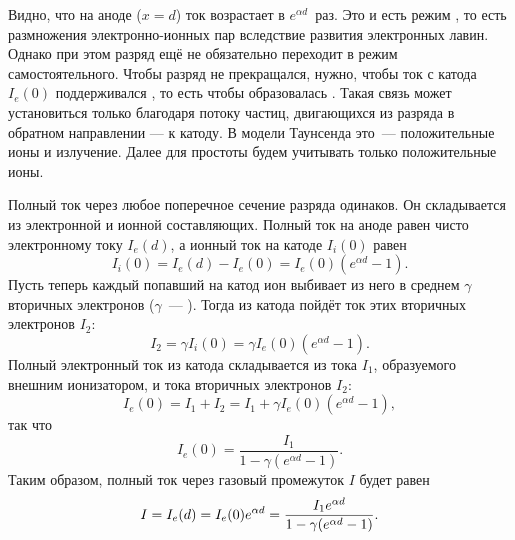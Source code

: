 Видно, что на аноде ($x=d$) ток возрастает в $e^{\alpha d}$~раз.
Это и есть режим , то есть размножения
электронно-ионных пар вследствие развития
электронных лавин. Однако при этом разряд ещё не обязательно переходит в режим
самостоятельного. Чтобы разряд не прекращался, нужно,
чтобы ток с катода $I_e(0)$ поддерживался ,
то есть чтобы образовалась .
Такая связь может установиться только благодаря потоку частиц, двигающихся
из разряда в обратном направлении --- к катоду. В модели Таунсенда это~---
положительные ионы и излучение. Далее для простоты будем учитывать только положительные ионы.

Полный ток через любое поперечное сечение разряда одинаков.
Он складывается из электронной и ионной составляющих.
Полный ток на аноде равен чисто электронному току $I_e(d)$,
а ионный ток на катоде $I_i(0)$ равен
\begin{equation*}
	I_i(0)=I_e(d)-I_e(0)=I_e(0)(e^{\alpha d}-1).
\end{equation*}
Пусть теперь каждый попавший на катод ион выбивает из него в среднем
$\gamma$ вторичных электронов
($\gamma$~--- ).
Тогда из катода пойдёт ток этих вторичных электронов $I_2$:
\begin{equation*}
	I_2=\gamma I_i(0)=\gamma I_e(0)(e^{\alpha d}-1).
\end{equation*}
Полный электронный ток из катода складывается из тока $I_1$,
образуемого внешним ионизатором, и тока вторичных электронов $I_2$:
\begin{equation*}
	I_e(0)=I_1+I_2=I_1+\gamma I_e(0)(e^{\alpha d}-1),
\end{equation*}
так что
\begin{equation*}
	I_e(0)=\frac{I_1}{1-\gamma(e^{\alpha d}-1)}.
\end{equation*}
Таким образом, полный ток через газовый промежуток $I$ будет равен
\begin{equation}
    \eqmark{taunsendI}
	I=I_e(d)=I_e(0)e^{\alpha d}=\frac{I_1e^{\alpha d}}{1-\gamma(e^{\alpha
d}-1)}.
\end{equation}

